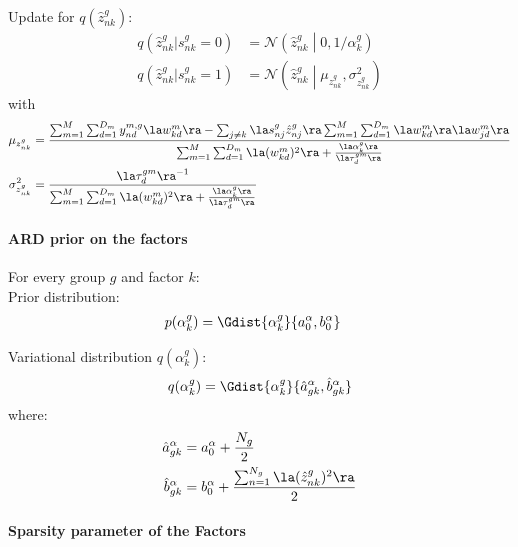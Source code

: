 Update for $q(\hat{z}_{nk}^g)$:
\begin{equation} \begin{aligned}
      q(\hat{z}_{nk}^g|s_{nk}^g=0) &= \mathcal{N} \left(\hat{z}_{nk}^g \middle| 0, 1/\alpha_k^g \right) \\
      q(\hat{z}_{nk}^g|s_{nk}^g=1) &= \mathcal{N} \left( \hat{z}_{nk}^g \middle| \mu_{z_{nk}^g}, \sigma_{z_{nk}^g}^2\right)
  \end{aligned} \end{equation}
with
\begin{equation} \begin{aligned}
  	\mu_{z_{nk}^g} &= \frac{ \sum_{m=1}^M\sum_{d=1}^{D_m} y_{nd}^{m,g} \la w^m_{kd} \ra - \sum_{j \neq k} \la s_{nj}^g\hat{z}_{nj}^g \ra \sum_{m=1}^M\sum_{d=1}^{D_m} \la w^m_{kd} \ra \la w^m_{jd} \ra } { \sum_{m=1}^M\sum_{d=1}^{D_m} \la (w_{kd}^m)^2 \ra + \frac{\la\alpha_k^g\ra}{\la\tau_d^{gm}\ra} }\\
  	\sigma_{z_{nk}^g}^2 &= \frac{ \la\tau_d^{gm}\ra^{-1} } { \sum_{m=1}^M\sum_{d=1}^{D_m} \la (w_{kd}^m)^2 \ra + \frac{\la\alpha_k^g\ra}{\la\tau_d^{gm}\ra} }
\end{aligned} \end{equation}


\paragraph*{ARD prior on the factors}

For every group $g$ and factor $k$: \\

Prior distribution:
\begin{align}
	p(\alpha_k^g) &= \Gdist{\alpha_k^g}{a_0^\alpha, b_0^\alpha}
\end{align}

Variational distribution $q(\alpha_k^g)$:
\begin{equation}
    q(\alpha^g_{k}) = \Gdist{\alpha_k^g}{\hat{a}_{gk}^{\alpha}, \hat{b}_{gk}^{\alpha}}
\end{equation}
where:
\begin{equation} \begin{aligned}
	\hat{a}_{gk}^\alpha &= a_0^\alpha + \frac{N_g}{2}\\
	\hat{b}_{gk}^\alpha &= b_0^\alpha +\frac{ \sum_{n=1}^{N_g} \la (\hat{z}_{nk}^g)^2 \ra }{2}
\end{aligned} \end{equation}

\paragraph*{Sparsity parameter of the Factors}

